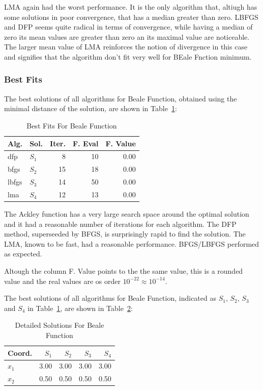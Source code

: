 \documentclass[conference]{IEEEtran}
\begin{document}
LMA again had the worst performance. It is the only algorithm that, altiugh has some solutions in
poor convergence, that has a median greater than zero. LBFGS and DFP seems quite radical in terms
of convergence, while having a median of zero its mean values are greater than zero an its maximal
value are noticeable. The larger mean value of LMA reinforces the notion of divergence in this case
and signifies that the algorithm don't fit very well for BEale Fnction minimum.


\subsubsection{Best Fits}
\label{bestfitsbeale2D}

The best solutions of all algorithms for Beale Function, obtained using the minimal
distance of the solution, are shown in Table~\ref{solutions:beale}:

\begin{table}[H]
\centering
\caption{Best Fits For Beale Function}
\label{solutions:beale}
\begin{tabular}{llrrr}
\toprule
 Alg. &    Sol. &  Iter. &  F. Eval &  F. Value \\
\midrule
  dfp & $S_{1}$ &      8 &       10 &      0.00 \\
 bfgs & $S_{2}$ &     15 &       18 &      0.00 \\
lbfgs & $S_{3}$ &     14 &       50 &      0.00 \\
  lma & $S_{4}$ &     12 &       13 &      0.00 \\
\bottomrule
\end{tabular}
\end{table}

The Ackley function has a very large search space around the optimal solution and
it had a reasonable number of iterations for each algorithm. The DFP method, superseeded by BFGS,
is surprisingly rapid to find the solution. The LMA, known to be fast, had a reasonable performance.
BFGS/LBFGS performed as expected.

Altough the column F. Value points to the the same value, this is a rounded value
and the real values are os order $10^{-22} \approx 10^{-14}$.


The best solutions of all algorithms for Beale Function, indicated as
$S_{1}$, $S_{2}$, $S_{3}$ and $S_{4}$ in Table~\ref{solutions:beale}, are shown
in Table~\ref{detailedsolutions:beale}:

\begin{table}[H]
\centering
\caption{Detailed Solutions For Beale Function}
\label{detailedsolutions:beale}
\begin{tabular}{lrrrr}
\toprule
 Coord. &  $S_{1}$ &  $S_{2}$ &  $S_{3}$ &  $S_{4}$ \\
\midrule
$x_{1}$ &     3.00 &     3.00 &     3.00 &     3.00 \\
$x_{2}$ &     0.50 &     0.50 &     0.50 &     0.50 \\
\bottomrule
\end{tabular}
\end{table}
\end{document}
